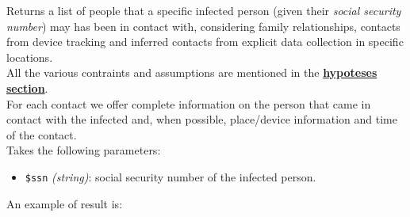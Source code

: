 \documentclass[12pt, a4paper]{article}
\begin{document}
\noindent %
Returns a list of people that a specific infected person (given their 
\emph{social security number}) may has been in contact with, considering 
family relationships, contacts from device tracking and inferred contacts from
explicit data collection in specific locations. \\
All the various contraints and assumptions are mentioned in the 
\hyperref[sec:Hypoteses]{\bf hypoteses section}. \\
For each contact we offer complete information on the person that came in 
contact with the infected and, when possible, place/device information and 
time of the contact. \\
Takes the following parameters: 

\begin{itemize}
    \item \texttt{\$ssn} \emph{(string)}: social security number of the 
        infected person.
\end{itemize}

\noindent %
An example of result is: 
\end{document}
